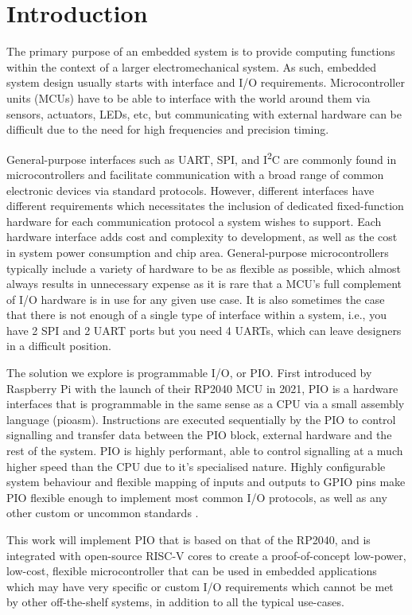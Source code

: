 \chapter{Introduction}
\label{ch:introduction}

The primary purpose of an embedded system is to provide computing functions within the context of a larger electromechanical system. As such, embedded system design usually starts with interface and I/O requirements. Microcontroller units (MCUs) have to be able to interface with the world around them via sensors, actuators, LEDs, etc, but communicating with external hardware can be difficult due to the need for high frequencies and precision timing.

General-purpose interfaces such as UART, SPI, and I\textsuperscript{2}C are commonly found in microcontrollers and facilitate communication with a broad range of common electronic devices via standard protocols. However, different interfaces have different requirements which necessitates the inclusion of dedicated fixed-function hardware for each communication protocol a system wishes to support. Each hardware interface adds cost and complexity to development, as well as the cost in system power consumption and chip area. General-purpose microcontrollers typically include a variety of hardware to be as flexible as possible, which almost always results in unnecessary expense as it is rare that a MCU's full complement of I/O hardware is in use for any given use case. It is also sometimes the case that there is not enough of a single type of interface within a system, i.e., you have 2 SPI and 2 UART ports but you need 4 UARTs, which can leave designers in a difficult position.

The solution we explore is programmable I/O, or PIO. First introduced by Raspberry Pi with the launch of their RP2040 MCU in 2021, PIO is a hardware interfaces that is programmable in the same sense as a CPU via a small assembly language (pioasm). Instructions are executed sequentially by the PIO to control signalling and transfer data between the PIO block, external hardware and the rest of the system. PIO is highly performant, able to control signalling at a much higher speed than the CPU due to it's specialised nature. Highly configurable system behaviour and flexible mapping of inputs and outputs to GPIO pins make PIO flexible enough to implement most common I/O protocols, as well as any other custom or uncommon standards \cite{rp2040}.

This work will implement PIO that is based on that of the RP2040, and is integrated with open-source RISC-V cores to create a proof-of-concept low-power, low-cost, flexible microcontroller that can be used in embedded applications which may have very specific or custom I/O requirements which cannot be met by other off-the-shelf systems, in addition to all the typical use-cases.

